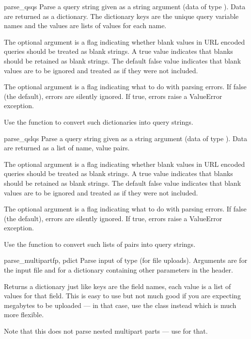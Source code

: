 \begin{funcdesc}{parse_qs}{qs}
Parse a query string given as a string argument (data of type 
).  Data are
returned as a dictionary.  The dictionary keys are the unique query
variable names and the values are lists of values for each name.

The optional argument  is
a flag indicating whether blank values in
URL encoded queries should be treated as blank strings.  
A true value indicates that blanks should be retained as 
blank strings.  The default false value indicates that
blank values are to be ignored and treated as if they were
not included.

The optional argument  is a flag indicating what
to do with parsing errors.  If false (the default), errors
are silently ignored.  If true, errors raise a ValueError
exception.

Use the  function to convert
such dictionaries into query strings.

\end{funcdesc}

\begin{funcdesc}{parse_qsl}{qs}
Parse a query string given as a string argument (data of type 
).  Data are
returned as a list of name, value pairs.

The optional argument  is
a flag indicating whether blank values in
URL encoded queries should be treated as blank strings.  
A true value indicates that blanks should be retained as 
blank strings.  The default false value indicates that
blank values are to be ignored and treated as if they were
not included.

The optional argument  is a flag indicating what
to do with parsing errors.  If false (the default), errors
are silently ignored.  If true, errors raise a ValueError
exception.

Use the  function to convert
such lists of pairs into query strings.
\end{funcdesc}

\begin{funcdesc}{parse_multipart}{fp, pdict}
Parse input of type  (for 
file uploads).  Arguments are  for the input file and
 for a dictionary containing other parameters in
the  header.

Returns a dictionary just like  keys are the
field names, each value is a list of values for that field.  This is
easy to use but not much good if you are expecting megabytes to be
uploaded --- in that case, use the  class instead
which is much more flexible.

Note that this does not parse nested multipart parts --- use
 for that.
\end{funcdesc}

